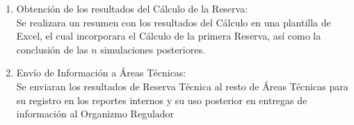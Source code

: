 \documentclass[11pt,twoside,openright,spanish]{report}
\numberwithin{equation}{chapter}
\numberwithin{figure}{chapter}
\numberwithin{table}{chapter}
\begin{document}
\begin{singlespace}
\begin{enumerate}
\begin{enumerate}
\begin{enumerate}
				\item Obtención de los resultados del Cálculo de la Reserva:\\ \-\hspace{0.5cm}
				Se realizara un resumen con los resultados del Cálculo en una plantilla de Excel, el cual incorporara el Cálculo de la primera Reserva, así como la conclusión de las $n$ simulaciones posteriores.
				\item Envío de Información a Áreas Técnicas:\\ \-\hspace{0.5cm}
				Se enviaran los resultados de Reserva Técnica al resto de Áreas Técnicas para su registro en los reportes internos y su uso posterior en entregas de información al Organizmo Regulador\\
				

\end{enumerate}
\end{enumerate}
\end{enumerate}
\end{singlespace}
\end{document}
